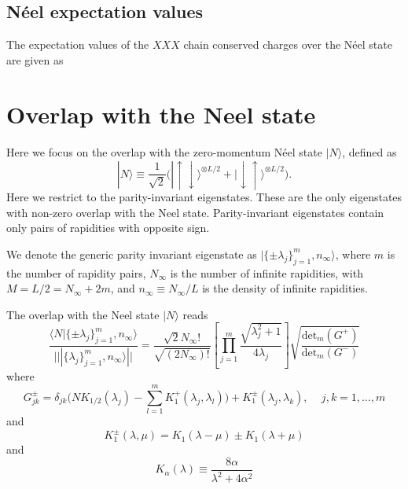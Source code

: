 \documentclass[11pt]{iopart}
\begin{document}
\subsection{N\'eel expectation values}
\label{Q-Neel}

The expectation values of the $XXX$ chain conserved charges over the N\'eel 
state are given as 

\section{Overlap with the Neel state}

Here we focus on the overlap with the zero-momentum N\'eel state $|N\rangle$, 
defined as 
%
\begin{equation}
\label{neel}
|N\rangle\equiv\frac{1}{\sqrt{2}}\Big(|\uparrow\downarrow\rangle^{\otimes L/2}
+|\downarrow\uparrow\rangle^{\otimes L/2}\Big).
\end{equation}
%
Here we restrict to the parity-invariant eigenstates. These are the only 
eigenstates with non-zero overlap with the Neel state. Parity-invariant 
eigenstates contain only pairs of rapidities with opposite sign.  

We denote the generic parity invariant eigenstate as $|\{\pm\lambda_j\}_{j=1}^m,
n_\infty\rangle$, where $m$ is the number of rapidity pairs, $N_{\infty}$ is the 
number of infinite rapidities, with $M=L/2=N_\infty+2m$, and $n_\infty\equiv 
N_\infty/L$ is the density of infinite rapidities. 

The overlap with the Neel state $|N\rangle$ reads 
%
\begin{equation}
\label{neel-ov}
\frac{\langle N|\{\pm\lambda_j\}_{j=1}^m,n_\infty\rangle}{|||\{\lambda_j\}_{j=1}^m,
n_\infty\rangle||}=\frac{\sqrt{2}N_{\infty}!}{\sqrt{(2N_\infty)!}}\left[\prod_{j=1}^m
\frac{\sqrt{\lambda_j^2+1}}{4\lambda_j}\right]\sqrt{\frac{\textrm{det}_m(G^+)}{
\textrm{det}_m(G^-)}}
\end{equation}
%
where 
%
\begin{equation}
\label{G-pm}
G^{\pm}_{jk}=\delta_{jk}\Big(NK_{1/2}(\lambda_j)-\sum\limits_{l=1}^mK_1^+(\lambda_j,
\lambda_l)\Big)+K_{1}^{\pm}(\lambda_j,\lambda_k),\quad\,j,k=1,\dots,m
\end{equation}
%
and 
%
\begin{equation}
\label{K-1}
K_1^\pm(\lambda,\mu)=K_1(\lambda-\mu)\pm K_1(\lambda+\mu)
\end{equation}
%
and 
%
\begin{equation}
\label{K-alpha}
K_\alpha(\lambda)\equiv\frac{8\alpha}{\lambda^2+4\alpha^2}
\end{equation}
%
\end{document}
